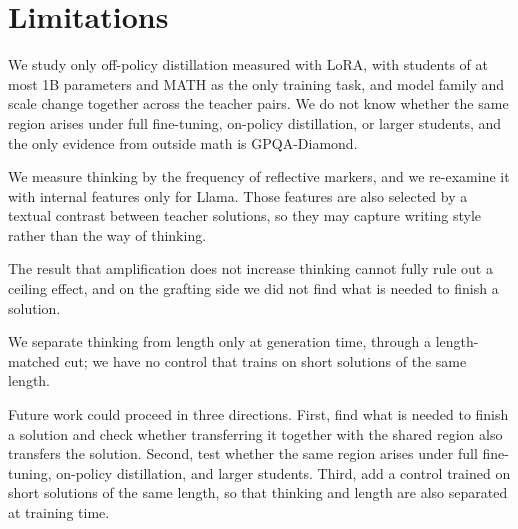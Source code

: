 \section*{Limitations}

We study only off-policy distillation measured with LoRA, with students of at most 1B parameters and MATH as the only training task, and model family and scale change together across the teacher pairs. We do not know whether the same region arises under full fine-tuning, on-policy distillation, or larger students, and the only evidence from outside math is GPQA-Diamond.

We measure thinking by the frequency of reflective markers, and we re-examine it with internal features only for Llama. Those features are also selected by a textual contrast between teacher solutions, so they may capture writing style rather than the way of thinking.

The result that amplification does not increase thinking cannot fully rule out a ceiling effect, and on the grafting side we did not find what is needed to finish a solution.

We separate thinking from length only at generation time, through a length-matched cut; we have no control that trains on short solutions of the same length.

Future work could proceed in three directions. First, find what is needed to finish a solution and check whether transferring it together with the shared region also transfers the solution. Second, test whether the same region arises under full fine-tuning, on-policy distillation, and larger students. Third, add a control trained on short solutions of the same length, so that thinking and length are also separated at training time.
